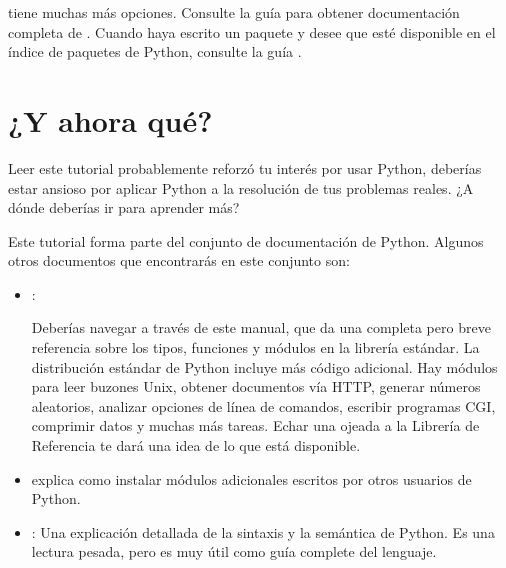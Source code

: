 \documentclass[a4,10pt,spanish]{sphinxmanual}
\begin{document}
\sphinxAtStartPar
{} tiene muchas más opciones.  Consulte la guía  para obtener documentación completa de .  Cuando haya escrito un paquete y desee que esté disponible en el índice de paquetes de Python, consulte la guía .


\chapter{¿Y ahora qué?}
\label{\detokenize{tutorial/whatnow:what-now}}\label{\detokenize{tutorial/whatnow:tut-whatnow}}\label{\detokenize{tutorial/whatnow::doc}}
\sphinxAtStartPar
Leer este tutorial probablemente reforzó tu interés por usar Python, deberías estar ansioso por aplicar Python a la resolución de tus problemas reales. ¿A dónde deberías ir para aprender más?

\sphinxAtStartPar
Este tutorial forma parte del conjunto de documentación de Python. Algunos otros documentos que encontrarás en este conjunto son:
\begin{itemize}
\item {} 
\sphinxAtStartPar
{}:

\sphinxAtStartPar
Deberías navegar a través de este manual, que da una completa pero breve referencia sobre los tipos, funciones y módulos en la librería estándar. La distribución estándar de Python incluye  más código adicional. Hay módulos para leer  buzones Unix,  obtener documentos vía HTTP,  generar números aleatorios, analizar opciones de línea de comandos, escribir programas CGI, comprimir datos y muchas más tareas. Echar una ojeada a la Librería de Referencia te dará una idea de lo que está disponible.

\item {} 
\sphinxAtStartPar
{}  explica como instalar módulos adicionales escritos por otros usuarios de Python.

\item {} 
\sphinxAtStartPar
{}: Una explicación detallada de la sintaxis y la semántica de Python. Es una lectura pesada, pero es muy útil como guía complete del lenguaje.

\end{itemize}
\end{document}
